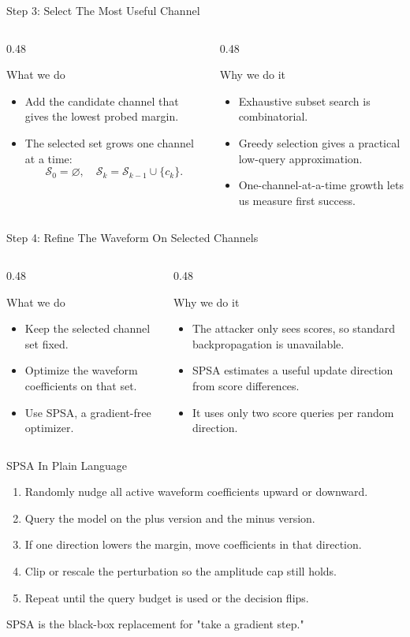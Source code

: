 \documentclass[aspectratio=169,11pt]{beamer}
\newcommand{\whatwhy}[2]{%
\begin{columns}[T,onlytextwidth]
  \begin{column}{0.48\textwidth}
    \begin{block}{What we do}
      #1
    \end{block}
  \end{column}
  \begin{column}{0.48\textwidth}
    \begin{block}{Why we do it}
      #2
    \end{block}
  \end{column}
\end{columns}
}
\newcommand{\smallgap}{\vspace{0.45em}}
\begin{document}
\begin{frame}{Step 3: Select The Most Useful Channel}
\whatwhy{
\begin{itemize}
  \item Add the candidate channel that gives the lowest probed margin.
  \item The selected set grows one channel at a time:
  \[
  \mathcal{S}_0=\varnothing,\quad
  \mathcal{S}_{k}=\mathcal{S}_{k-1}\cup\{c_k\}.
  \]
\end{itemize}
}{
\begin{itemize}
  \item Exhaustive subset search is combinatorial.
  \item Greedy selection gives a practical low-query approximation.
  \item One-channel-at-a-time growth lets us measure first success.
\end{itemize}
}
\end{frame}

\begin{frame}{Step 4: Refine The Waveform On Selected Channels}
\whatwhy{
\begin{itemize}
  \item Keep the selected channel set fixed.
  \item Optimize the waveform coefficients on that set.
  \item Use SPSA, a gradient-free optimizer.
\end{itemize}
}{
\begin{itemize}
  \item The attacker only sees scores, so standard backpropagation is unavailable.
  \item SPSA estimates a useful update direction from score differences.
  \item It uses only two score queries per random direction.
\end{itemize}
}
\end{frame}

\begin{frame}{SPSA In Plain Language}
\begin{enumerate}
  \item Randomly nudge all active waveform coefficients upward or downward.
  \item Query the model on the plus version and the minus version.
  \item If one direction lowers the margin, move coefficients in that direction.
  \item Clip or rescale the perturbation so the amplitude cap still holds.
  \item Repeat until the query budget is used or the decision flips.
\end{enumerate}

\smallgap
\begin{center}
\small SPSA is the black-box replacement for "take a gradient step."
\end{center}
\end{frame}
\end{document}
